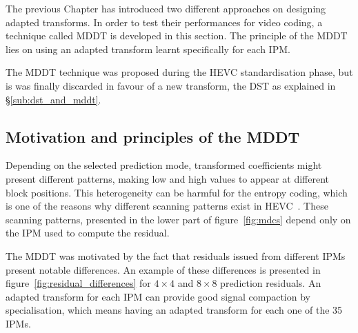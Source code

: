 \documentclass[11pt,a4paper,openright,twoside]{book}
\numberwithin{equation}{section} %
\numberwithin{figure}{section} %
\numberwithin{table}{section} %
\begin{document}
The previous Chapter has introduced two different approaches on designing
adapted transforms.
In order to test their performances for video coding, a technique called
\ac{MDDT} is developed in this section.
The principle of the \ac{MDDT} lies on using an adapted transform learnt
specifically for each \acf{IPM}.

The \ac{MDDT} technique was proposed during the \ac{HEVC} standardisation
phase, but is was finally discarded in favour of a new transform, the
\ac{DST} as explained in \S\ref{sub:dst_and_mddt}.

\subsection{Motivation and principles of the \acs{MDDT}}
\label{sub:mddt_motivation}

Depending on the selected prediction mode, transformed coefficients might
present different patterns, making low and high values to appear at different
block positions.
This heterogeneity can be harmful for the entropy coding, which is one of the
reasons why different scanning patterns exist in
\ac{HEVC}~\cite{sole-12-transform-coefficient-coding}.
These scanning patterns, presented in the lower part of
figure~\ref{fig:mdcs} depend only on the \ac{IPM} used to compute the
residual.

The \ac{MDDT} was motivated by the fact that residuals issued from different
\acp{IPM} present notable differences.
An example of these differences is presented in
figure~\ref{fig:residual_differences} for $4\times4$ and $8\times8$ prediction
residuals.
An adapted transform for each \ac{IPM} can provide good signal compaction by
specialisation, which means having an adapted transform for each one of the 35
\acp{IPM}.
\end{document}

